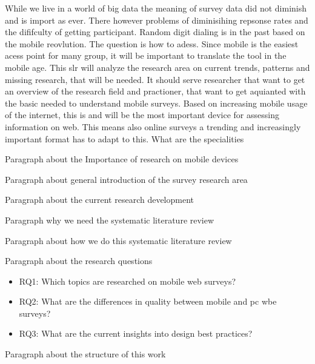 While we live in a world of big data the meaning of survey data did not diminish and is import as ever. There however problems of diminisihing repsonse rates and the dififculty of getting participant. Random digit dialing is in the past based on the mobile reovlution. The question is how to adess. Since mobile is the easiest acess point for many group, it will be important to translate the tool in the mobile age. This slr will analyze the research area on current trends, patterns and missing research, that will be needed. It should serve researcher that want to get an overview of the research field and practioner, that want to get aquianted with the basic needed to understand mobile surveys. 
Based on increasing mobile usage of the internet, this is and will be the most important device for assessing information on web. This means also online surveys a trending and increasingly important format has to adapt to this. What are the specialities

Paragraph about the Importance of research on mobile devices

Paragraph about general introduction of the survey research area

Paragraph about the current research development

Paragraph why we need the systematic literature review

Paragraph about how we do this systematic literature review

Paragraph about the research questions
\begin{itemize}
    \item RQ1: Which topics are researched on mobile web surveys?
    \item RQ2: What are the differences in quality between mobile and pc wbe surveys?
    \item RQ3: What are the current insights into design best practices?
\end{itemize}

Paragraph about the structure of this work
